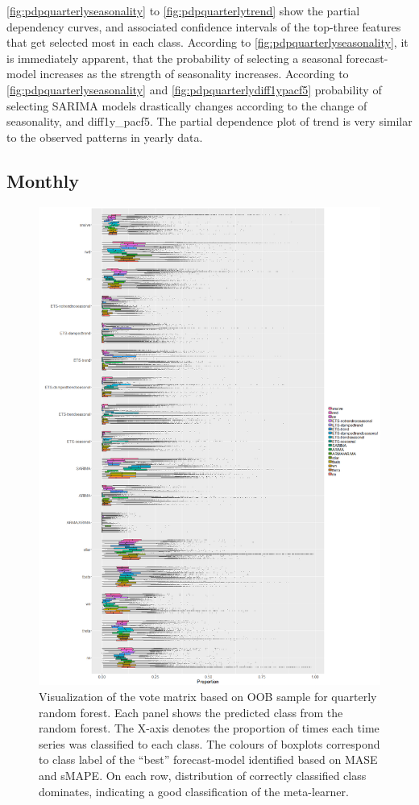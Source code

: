 \documentclass[11pt,a4paper,]{article}
\begin{document}
\autoref{fig:pdpquarterlyseasonality} to \autoref{fig:pdpquarterlytrend}
show the partial dependency curves, and associated confidence intervals
of the top-three features that get selected most in each class.
According to \autoref{fig:pdpquarterlyseasonality}, it is immediately
apparent, that the probability of selecting a seasonal forecast-model
increases as the strength of seasonality increases. According to
\autoref{fig:pdpquarterlyseasonality} and
\autoref{fig:pdpquarterlydiff1ypacf5} probability of selecting SARIMA
models drastically changes according to the change of seasonality, and
diff1y\_pacf5. The partial dependence plot of trend is very similar to
the observed patterns in yearly data.

\subsection{Monthly}\label{monthly}

\begin{figure}
\centering
\includegraphics{figures/oobmonthly-1.png}
\caption{\label{fig:oobmonthly}Visualization of the vote matrix based on OOB
sample for quarterly random forest. Each panel shows the predicted class
from the random forest. The X-axis denotes the proportion of times each
time series was classified to each class. The colours of boxplots
correspond to class label of the ``best'' forecast-model identified
based on MASE and sMAPE. On each row, distribution of correctly
classified class dominates, indicating a good classification of the
meta-learner.}
\end{figure}
\end{document}

